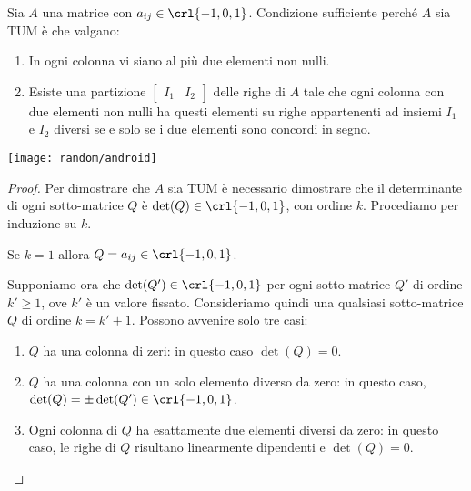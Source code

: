 \documentclass[\main/main.tex]{subfiles}
\begin{document}
\begin{minipage}{\textwidth}
  \begin{minipage}{.83\textwidth}
    \flushleft
    \begin{theorem}
      Sia $A$ una matrice con $a_{ij} \in \crl{-1,0,1}$. Condizione sufficiente perché $A$ sia TUM è che valgano:
      \begin{enumerate}
        \item In ogni colonna vi siano al più due elementi non nulli.
        \item Esiste una partizione $\begin{bmatrix}
                  I_1 & I_2
                \end{bmatrix}$ delle righe di $A$ tale che ogni colonna con due elementi non nulli ha questi elementi su righe appartenenti ad insiemi $I_1$ e $I_2$ diversi se e solo se i due elementi sono concordi in segno.
      \end{enumerate}
    \end{theorem}
  \end{minipage}\hfill
  \begin{minipage}{0.15\textwidth}\center
    \texttt{[image: random/android]}
  \end{minipage}
\end{minipage}


\begin{proof}
  Per dimostrare che $A$ sia TUM è necessario dimostrare che il determinante di ogni sotto-matrice $Q$ è $\det(Q) \in \crl{-1, 0, 1}$, con ordine $k$. Procediamo per induzione su $k$.

  Se $k=1$ allora $Q = a_{ij} \in \crl{-1,0,1}$.

  Supponiamo ora che $\det(Q') \in \crl{-1,0,1}$ per ogni sotto-matrice $Q'$ di ordine $k'\geq1$, ove $k'$ è un valore fissato. Consideriamo quindi una qualsiasi sotto-matrice $Q$ di ordine $k = k'+1$. Possono avvenire solo tre casi:
  \begin{enumerate}
    \item $Q$ ha una colonna di zeri: in questo caso $\det(Q)=0$.
    \item $Q$ ha una colonna con un solo elemento diverso da zero: in questo caso, $\det(Q) = \pm \det(Q') \in \crl{-1,0,1}$.
    \item Ogni colonna di $Q$ ha esattamente due elementi diversi da zero: in questo caso, le righe di $Q$ risultano linearmente dipendenti e $\det(Q)=0$.
  \end{enumerate}
\end{proof}
\end{document}
